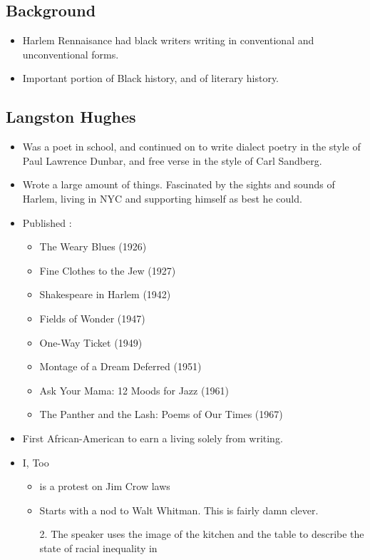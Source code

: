 \documentclass[10pt]{article}
\begin{document}
\subsection{Background}
\begin{itemize}
	\item Harlem Rennaisance had black writers writing
		in conventional and unconventional forms.
	\item Important portion of Black history, and of
		literary history.
\end{itemize}

\subsection{Langston Hughes}
\begin{itemize}
	\item Was a poet in school, and continued on to 
		write dialect poetry in the style of Paul
		Lawrence Dunbar, and free verse in the style 
		of Carl Sandberg.
	\item Wrote a large amount of things.  Fascinated
		by the sights and sounds of Harlem, living in 
		NYC and supporting himself as best he could.
	\item Published :
		\begin{itemize}
			\item The Weary Blues (1926)
			\item Fine Clothes to the Jew (1927)
			\item Shakespeare in Harlem (1942)
			\item Fields of Wonder (1947)
			\item One-Way Ticket (1949)
			\item Montage of a Dream Deferred (1951)
			\item Ask Your Mama: 12 Moods for Jazz  (1961)
			\item The Panther and the Lash: Poems of Our 
				Times (1967)
		\end{itemize}
	\item First African-American to earn a living
		solely from writing.
	\item I, Too 
		\begin{itemize}
			\item is a protest on Jim Crow laws
			\item Starts with a nod to Walt Whitman.
				This is fairly damn clever.
			\item[2. ] The speaker uses the image of
				the kitchen and the table to describe
				the state of racial inequality in 

\end{itemize}
\end{itemize}
\end{document}
